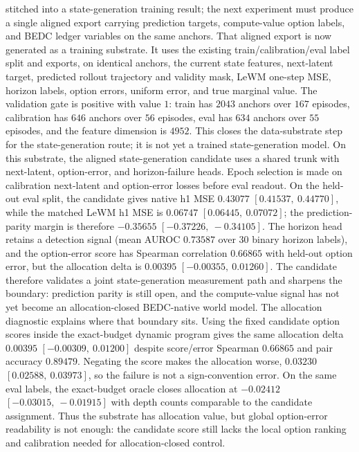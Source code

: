 stitched into a state-generation training result; the next experiment must
produce a single aligned export carrying prediction targets, compute-value
option labels, and BEDC ledger variables on the same anchors.
That aligned export is now generated as a training substrate.  It uses the
existing train/calibration/eval label split and exports, on identical anchors,
the current state features, next-latent target, predicted rollout trajectory and
validity mask, LeWM one-step MSE, horizon labels, option errors, uniform error,
and true marginal value.  The validation gate is positive with value $1$:
train has $2043$ anchors over $167$ episodes, calibration has $646$ anchors
over $56$ episodes, eval has $634$ anchors over $55$ episodes, and the feature
dimension is $4952$.  This closes the data-substrate step for the
state-generation route; it is not yet a trained state-generation model.
On this substrate, the aligned state-generation candidate uses a shared trunk
with next-latent, option-error, and horizon-failure heads.  Epoch selection is
made on calibration next-latent and option-error losses before eval readout.
On the held-out eval split, the candidate gives native h1 MSE $0.43077$
$[0.41537,\ 0.44770]$, while the matched LeWM h1 MSE is $0.06747$
$[0.06445,\ 0.07072]$; the prediction-parity margin is therefore $-0.35655$
$[-0.37226,\ -0.34105]$.  The horizon head retains a detection signal
(mean AUROC $0.73587$ over $30$ binary horizon labels), and the option-error
score has Spearman correlation $0.66865$ with held-out option error, but the
allocation delta is $0.00395$ $[-0.00355,\ 0.01260]$.  The candidate therefore
validates a joint state-generation measurement path and sharpens the boundary:
prediction parity is still open, and the compute-value signal has not yet
become an allocation-closed BEDC-native world model.
The allocation diagnostic explains where that boundary sits.  Using the fixed
candidate option scores inside the exact-budget dynamic program gives the same
allocation delta $0.00395$ $[-0.00309,\ 0.01200]$ despite score/error
Spearman $0.66865$ and pair accuracy $0.89479$.  Negating the score makes the
allocation worse, $0.03230$ $[0.02588,\ 0.03973]$, so the failure is not a
sign-convention error.  On the same eval labels, the exact-budget oracle closes
allocation at $-0.02412$ $[-0.03015,\ -0.01915]$ with depth counts comparable
to the candidate assignment.  Thus the substrate has allocation value, but
global option-error readability is not enough: the candidate score still lacks
the local option ranking and calibration needed for allocation-closed control.
